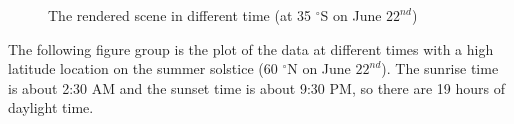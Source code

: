 \documentclass{article}
\begin{document}
\begin{itemize}
\begin{figure}[h]
  \hfill
  \hfill

  \caption{The rendered scene in different time (at 35 $^{\circ}$S on June \(22^{nd}\))}
  \label{fig:AllL35S}
\end{figure}

The following figure group is the plot of the data at different times with a high latitude location on the summer 
solstice (60 $^{\circ}$N on June \(22^{nd}\)). The sunrise time is about 2:30 AM and the sunset time is about 9:30 
PM, so there are 19 hours of daylight time.


\end{itemize}
\end{document}
